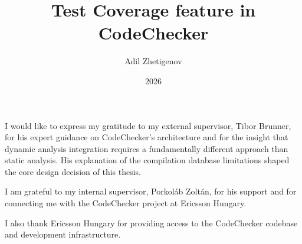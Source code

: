 \documentclass[
]{elteikthesis}[2024/04/26]
\title{Test Coverage feature in CodeChecker} %
\date{2026} %
\author{Adil Zhetigenov}
\affiliation{Associate Professor, habil.PhD} %
\begin{document}

\maketitle



\tableofcontents
\cleardoublepage


\cleardoublepage


\cleardoublepage


\cleardoublepage


\cleardoublepage

\chapter*{\acklabel}
I would like to express my gratitude to my external supervisor, Tibor Brunner, for his expert guidance on CodeChecker's architecture and for the insight that dynamic analysis integration requires a fundamentally different approach than static analysis. His explanation of the compilation database limitations shaped the core design decision of this thesis.

I am grateful to my internal supervisor, Porkoláb Zoltán, for his support and for connecting me with the CodeChecker project at Ericsson Hungary.

I also thank Ericsson Hungary for providing access to the CodeChecker codebase and development infrastructure.

\appendix

\cleardoublepage

{}
\printbibliography[title=\biblabel]
\cleardoublepage

{}
\listoffigures
\cleardoublepage

{}
\lstlistoflistings
\cleardoublepage

{}
\listoftables
\cleardoublepage
\end{document}
